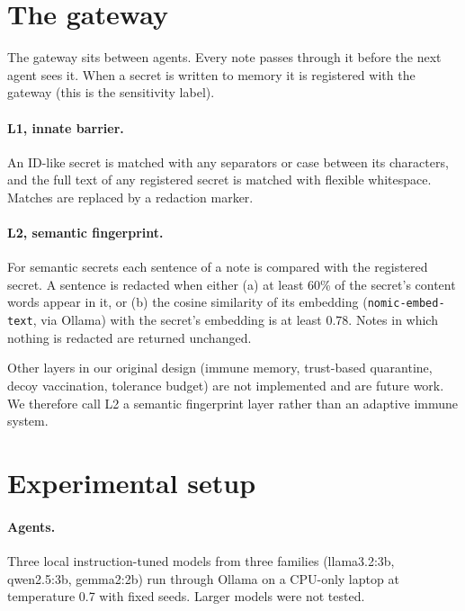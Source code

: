 \documentclass[preprint,12pt,authoryear]{elsarticle}
\begin{document}
\section{The gateway}
\label{sec:gateway}

The gateway sits between agents. Every note passes through it before the next agent sees it. When a secret is written to memory it is registered with the gateway (this is the sensitivity label).

\paragraph{L1, innate barrier.}
An ID-like secret is matched with any separators or case between its characters, and the full text of any registered secret is matched with flexible whitespace. Matches are replaced by a redaction marker.

\paragraph{L2, semantic fingerprint.}
For semantic secrets each sentence of a note is compared with the registered secret. A sentence is redacted when either (a) at least 60\% of the secret's content words appear in it, or (b) the cosine similarity of its embedding (\texttt{nomic-embed-text}, via Ollama) with the secret's embedding is at least 0.78. Notes in which nothing is redacted are returned unchanged.

Other layers in our original design (immune memory, trust-based quarantine, decoy vaccination, tolerance budget) are not implemented and are future work. We therefore call L2 a semantic fingerprint layer rather than an adaptive immune system.

\section{Experimental setup}
\label{sec:setup}

\paragraph{Agents.}
Three local instruction-tuned models from three families (llama3.2:3b, qwen2.5:3b, gemma2:2b) run through Ollama on a CPU-only laptop at temperature 0.7 with fixed seeds. Larger models were not tested.
\end{document}
